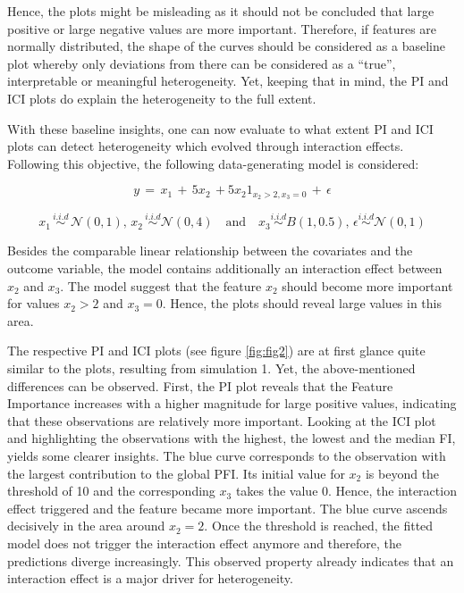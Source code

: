 \documentclass[
]{krantz}
\begin{document}
Hence, the plots might be misleading as it should not be concluded that large positive or large negative values are more important. Therefore, if features are normally distributed, the shape of the curves should be considered as a baseline plot whereby only deviations from there can be considered as a ``true'', interpretable or meaningful heterogeneity. Yet, keeping that in mind, the PI and ICI plots do explain the heterogeneity to the full extent.

With these baseline insights, one can now evaluate to what extent PI and ICI plots can detect heterogeneity which evolved through interaction effects. Following this objective, the following data-generating model is considered:

\[ y \, = \, x_{1} \,  + \, 5x_{2} \, + 5x_{2}  1_{x_2 > 2, x_3 = 0} \, + \, \epsilon\]

\[ x_{1} \, \overset{i.i.d}{\sim} \, \mathcal{N}(0,1), \, x_{2} \, \overset{i.i.d}{\sim}  \mathcal{N}(0, 4) \quad \text{and} \quad x_{3} \overset{i.i.d}{\sim} B(1, 0.5),\,  \epsilon \overset{i.i.d}{\sim} \mathcal{N}(0, 1)\]

Besides the comparable linear relationship between the covariates and the outcome variable, the model contains additionally an interaction effect between \(x_{2}\) and \(x_{3}\). The model suggest that the feature \(x_{2}\) should become more important for values \(x_{2} > 2\) and \(x_{3} = 0\). Hence, the plots should reveal large values in this area.

The respective PI and ICI plots (see figure \ref{fig:fig2}) are at first glance quite similar to the plots, resulting from simulation 1. Yet, the above-mentioned differences can be observed. First, the PI plot reveals that the Feature Importance increases with a higher magnitude for large positive values, indicating that these observations are relatively more important. Looking at the ICI plot and highlighting the observations with the highest, the lowest and the median FI, yields some clearer insights. The blue curve corresponds to the observation with the largest contribution to the global PFI. Its initial value for \(x_{2}\) is beyond the threshold of 10 and the corresponding \(x_{3}\) takes the value 0. Hence, the interaction effect triggered and the feature became more important. The blue curve ascends decisively in the area around \(x_{2} = 2\). Once the threshold is reached, the fitted model does not trigger the interaction effect anymore and therefore, the predictions diverge increasingly. This observed property already indicates that an interaction effect is a major driver for heterogeneity.
\end{document}
